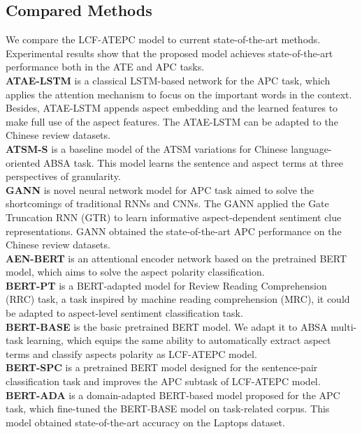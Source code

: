 \documentclass[a4paper,fleqn]{cas-sc}
\begin{document}
\subsection{Compared Methods}



We compare the LCF-ATEPC model to current state-of-the-art methods. Experimental results show that the proposed model achieves state-of-the-art performance both in the ATE and APC tasks. \\
\textbf{ATAE-LSTM} \cite{wang2016attention} is a classical LSTM-based network for the APC task, which applies the attention mechanism to focus on the important words in the context. Besides, ATAE-LSTM appends aspect embedding and the learned features to make full use of the aspect features. The ATAE-LSTM can be adapted to the Chinese review datasets.\\
\textbf{ATSM-S} \cite{peng2018learning} is a baseline model of the ATSM variations for Chinese language-oriented ABSA task. This model learns the sentence and aspect terms at three perspectives of granularity. \\
\textbf{GANN} is novel neural network model for APC task aimed to solve the shortcomings of traditional RNNs and CNNs. The GANN applied the Gate Truncation RNN (GTR) to learn informative aspect-dependent sentiment clue representations. GANN obtained the state-of-the-art APC performance on the Chinese review datasets. \\
\textbf{AEN-BERT} \cite{song2019attentional} is an attentional encoder network based on the pretrained BERT model, which aims to solve the aspect polarity classification. \\
\textbf{BERT-PT} \cite{xu2019bert} is a BERT-adapted model for Review Reading Comprehension (RRC) task, a task inspired by machine reading comprehension (MRC), it could be adapted to aspect-level sentiment classification task. \\
\textbf{BERT-BASE} \cite{devlin2019bert} is the basic pretrained BERT model. We adapt it to ABSA multi-task learning, which equips the same ability to automatically extract aspect terms and classify aspects polarity as LCF-ATEPC model. \\
\textbf{BERT-SPC} \cite{song2019attentional} is a pretrained BERT model designed for the sentence-pair classification task and improves the APC subtask of LCF-ATEPC model. \\
\textbf{BERT-ADA} \cite{rietzler2019adapt} is a domain-adapted BERT-based model proposed for the APC task, which fine-tuned the BERT-BASE model on task-related corpus. This model obtained state-of-the-art accuracy on the Laptops dataset.\\
\end{document}
